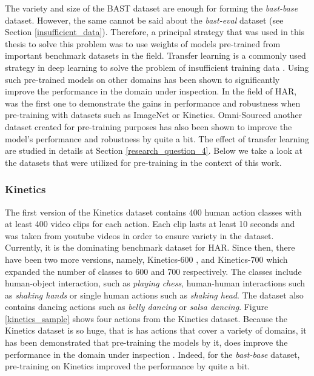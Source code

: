 \documentclass[extern,palatino]{cgMA}
\begin{document}
The variety and size of the BAST dataset are enough for forming the \textit{bast-base} dataset. However, the same cannot be said about the \textit{bast-eval} dataset (see Section \ref{insufficient_data}). Therefore, a principal strategy that was used in this thesis to solve this problem was to use weights of models pre-trained from important benchmark datasets in the field. Transfer learning is a commonly used strategy in deep learning to solve the problem of insufficient training data \cite{tan2018survey}. Using such pre-trained models on other domains has been shown to significantly improve the performance in the domain under inspection. In the field of HAR, \cite{carreira2017quo} was the first one to demonstrate the gains in performance and robustness when pre-training with datasets such as ImageNet or Kinetics. Omni-Sourced \cite{duan2020omni} another dataset created for pre-training purposes has also been shown to improve the model's performance and robustness by quite a bit. The effect of transfer learning are studied in details at Section \ref{research_question_4}. Below we take a look at the datasets that were utilized for pre-training in the context of this work.

\subsubsection{Kinetics}
\label{kinetics400}
The first version of the Kinetics dataset \cite{kay2017kinetics} contains 400 human action classes with at least 400 video clips for each action. Each clip lasts at least 10 seconds and was taken from youtube videos in order to ensure variety in the dataset. Currently, it is the dominating benchmark dataset for HAR. Since then, there have been two more versions, namely, Kinetics-600 \cite{carreira2018short}, and Kinetics-700 \cite{carreira2019short} which expanded the number of classes to 600 and 700 respectively. The classes include human-object interaction, such as \textit{playing chess}, human-human interactions such as \textit{shaking hands} or single human actions such as \textit{shaking head}. The dataset also contains dancing actions such as \textit{belly dancing} or \textit{salsa dancing}. Figure \ref{kinetics_sample} shows four actions from the Kinetics dataset. Because the Kinetics dataset is so huge, that is has actions that cover a variety of domains, it has been demonstrated that pre-training the models by it, does improve the performance in the domain under inspection \cite{carreira2017quo}. Indeed, for the \textit{bast-base} dataset, pre-training on Kinetics improved the performance by quite a bit. 
\end{document}
